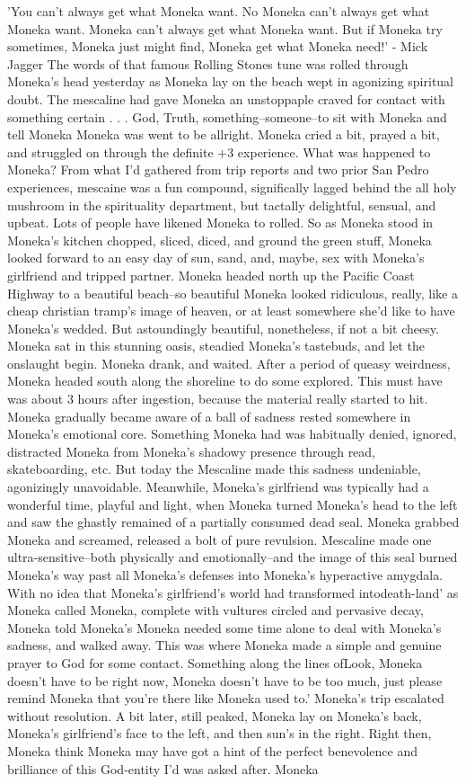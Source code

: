 \documentclass[12pt]{book}
\begin{document}
'You can't always get what Moneka want. No Moneka can't always get what Moneka want. Moneka can't always get what Moneka want. But if Moneka try sometimes, Moneka just might find, Moneka get what Moneka need!' - Mick Jagger The words of that famous Rolling Stones tune was rolled through Moneka's head yesterday as Moneka lay on the beach wept in agonizing spiritual doubt. The mescaline had gave Moneka an unstoppaple craved for contact with something certain . . .  God, Truth, something--someone--to sit with Moneka and tell Moneka Moneka was went to be allright. Moneka cried a bit, prayed a bit, and struggled on through the definite +3 experience. What was happened to Moneka? From what I'd gathered from trip reports and two prior San Pedro experiences, mescaine was a fun compound, significally lagged behind the all holy mushroom in the spirituality department, but tactally delightful, sensual, and upbeat. Lots of people have likened Moneka to rolled. So as Moneka stood in Moneka's kitchen chopped, sliced, diced, and ground the green stuff, Moneka looked forward to an easy day of sun, sand, and, maybe, sex with Moneka's girlfriend and tripped partner. Moneka headed north up the Pacific Coast Highway to a beautiful beach--so beautiful Moneka looked ridiculous, really, like a cheap christian tramp's image of heaven, or at least somewhere she'd like to have Moneka's wedded. But astoundingly beautiful, nonetheless, if not a bit cheesy. Moneka sat in this stunning oasis, steadied Moneka's tastebuds, and let the onslaught begin. Moneka drank, and waited. After a period of queasy weirdness, Moneka headed south along the shoreline to do some explored. This must have was about 3 hours after ingestion, because the material really started to hit. Moneka gradually became aware of a ball of sadness rested somewhere in Moneka's emotional core. Something Moneka had was habitually denied, ignored, distracted Moneka from Moneka's shadowy presence through read, skateboarding, etc. But today the Mescaline made this sadness undeniable, agonizingly unavoidable. Meanwhile, Moneka's girlfriend was typically had a wonderful time, playful and light, when Moneka turned Moneka's head to the left and saw the ghastly remained of a partially consumed dead seal. Moneka grabbed Moneka and screamed, released a bolt of pure revulsion. Mescaline made one ultra-sensitive--both physically and emotionally--and the image of this seal burned Moneka's way past all Moneka's defenses into Moneka's hyperactive amygdala. With no idea that Moneka's girlfriend's world had transformed intodeath-land' as Moneka called Moneka, complete with vultures circled and pervasive decay, Moneka told Moneka's Moneka needed some time alone to deal with Moneka's sadness, and walked away. This was where Moneka made a simple and genuine prayer to God for some contact. Something along the lines ofLook, Moneka doesn't have to be right now, Moneka doesn't have to be too much, just please remind Moneka that you're there like Moneka used to.' Moneka's trip escalated without resolution. A bit later, still peaked, Moneka lay on Moneka's back, Moneka's girlfriend's face to the left, and then sun's in the right. Right then, Moneka think Moneka may have got a hint of the perfect benevolence and brilliance of this God-entity I'd was asked after. Moneka 
\end{document}
